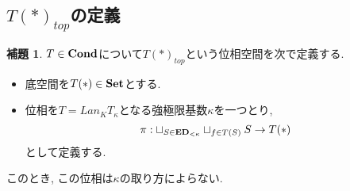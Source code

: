 \documentclass[dvipdfmx,a4paper,11pt]{article}
\theoremstyle{definition}
\newtheorem{lem}[thm]{補題}
\begin{document}
\subsection{$T(\ast)_{top}$の定義}
 \begin{tcolorbox}
 [colback = white, colframe = green!35!black, fonttitle = \bfseries,breakable = true]
\begin{lem} \cite{Sch19}
$T \in {\bf Cond}$について$T(\ast)_{top}$という位相空間を次で定義する.
\begin{itemize}
\item 底空間を$T(\ast) \in {\bf Set}$とする. 
\item 位相を$T = Lan_{K}T_{\kappa}$となる強極限基数$\kappa$を一つとり, 
$$
\pi : \sqcup_{S \in {\bf ED}_{<\kappa}}  \sqcup_{f \in T(S) }  S \to T(\ast)
$$
として定義する.
\end{itemize}
このとき, この位相は$\kappa$の取り方によらない. 
\end{lem}
 \end{tcolorbox}
\end{document}
